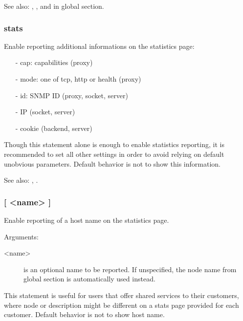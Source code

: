 {  See also: , ,  and  in
            global section.

\subsubsection[show-legends]{stats }



  Enable reporting additional informations on the statistics page:
  \begin{itemize}
  \item[-] cap: capabilities (proxy)
  \item[-] mode: one of tcp, http or health (proxy)
  \item[-] id: SNMP ID (proxy, socket, server)
  \item[-] IP (socket, server)
  \item[-] cookie (backend, server)
  \end{itemize}

  Though this statement alone is enough to enable statistics reporting, it is
  recommended to set all other settings in order to avoid relying on default
  unobvious parameters.  Default behavior is not to show this information.

  See also: , .


\subsubsection[stats show-node]{ [ <name> ]}

  Enable reporting of a host name on the statistics page.


  Arguments:
  \begin{description}
  \item[<name>] is an optional name to be reported. If unspecified, the
              node name from global section is automatically used instead.
  \end{description}

  This statement is useful for users that offer shared services to their
  customers, where node or description might be different on a stats page
  provided for each customer.  Default behavior is not to show host name.

}
